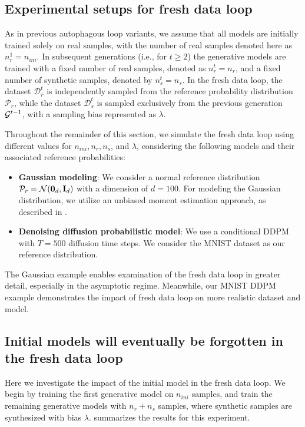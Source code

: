 \documentclass{article}
\def\bias{{\lambda}}
\def\colorFresh{colorC}
\def\fresh{\textcolor{\colorFresh}{fresh data loop}}
\begin{document}
\subsection{Experimental setups for \fresh{}}
\label{section5}


As in previous autophagous loop variants, we assume that all models are initially trained solely on real samples, with the number of real samples denoted here as $n_r^1 = n_{ini}$. In subsequent generations (i.e., for $t \geq 2$) the generative models are trained with a fixed number of real samples, denoted as $n_r^t = n_r$, and a fixed number of synthetic samples, denoted by $n_s^t = n_s$. In the \fresh{}, the dataset $\mathcal{D}_r^t$ is independently sampled from the reference probability distribution $\mathcal{P}_r$, while the dataset $\mathcal{D}_s^t$ is sampled exclusively from the previous generation $\mathcal{G}^{t-1}$, with a sampling bias represented as $\bias$.

Throughout the remainder of this section, we simulate the \fresh{} using different values for $n_{ini}, n_r, n_s$, and $\bias$, considering the following models and their associated reference probabilities:

\begin{itemize}
    \item \textbf{Gaussian modeling}: We consider a normal reference distribution $\mathcal{P}_r = \mathcal{N}(\bm{0}_d, \mathbf I_d)$ with a dimension of $d = 100$. For modeling the Gaussian distribution, we utilize an unbiased moment estimation approach, as described in .

    \item \textbf{Denoising diffusion probabilistic model}: We use a conditional DDPM \cite{ddpm} with $T = 500$ diffusion time steps. We consider the MNIST dataset as our reference distribution. 
\end{itemize}

The Gaussian example enables examination of the \fresh{} in greater detail, especially in the asymptotic regime. Meanwhile, our MNIST DDPM example demonstrates the impact of \fresh{} on more realistic dataset and model.

\subsection{Initial models will eventually be forgotten in the \fresh{}} 

Here we investigate the impact of the initial model in the \fresh{}. We begin by training the first generative model on $n_{ini}$ samples, and train the remaining generative models with $n_r + n_s$ samples, where synthetic samples are synthesized with bias $\bias$.  summarizes the results for this experiment. 
\end{document}
